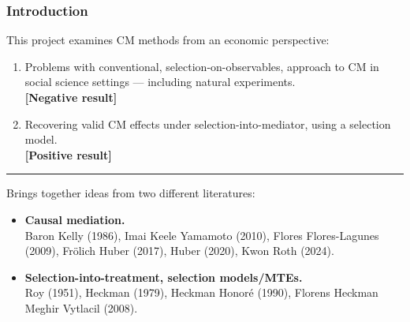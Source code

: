 \documentclass[dvipsnames]{beamer} %
\begin{document}
\begin{frame}[noframenumbering]
    \frametitle{Introduction}
    This project examines CM methods from an economic perspective:
    \begin{enumerate}
        \item Problems with conventional, selection-on-observables, approach to CM in social science settings --- including natural experiments.
        \\ \textbf{[Negative result]}
        \item Recovering valid CM effects under selection-into-mediator, using a selection model.
        \\ \textbf{[Positive result]}
    \end{enumerate}
    \par\noindent\rule{\textwidth}{0.4pt}
    Brings together ideas from two different literatures:
    \begin{itemize}
        \item \textbf{Causal mediation.}
        \\ Baron Kelly (1986), Imai Keele Yamamoto (2010), Flores Flores-Lagunes (2009), Fr\"olich Huber (2017), Huber (2020), Kwon Roth (2024).
        \item \textbf{Selection-into-treatment, selection models/MTEs.}
        \\ Roy (1951), Heckman (1979), Heckman Honor\'e (1990), Florens Heckman Meghir Vytlacil (2008).
    \end{itemize}
\end{frame}%
\end{document}
